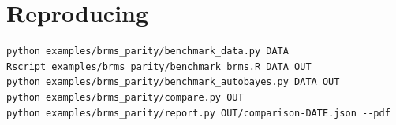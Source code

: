 \documentclass[11pt]{article}
\begin{document}
\section{Reproducing}

\begin{verbatim}
python examples/brms_parity/benchmark_data.py DATA
Rscript examples/brms_parity/benchmark_brms.R DATA OUT
python examples/brms_parity/benchmark_autobayes.py DATA OUT
python examples/brms_parity/compare.py OUT
python examples/brms_parity/report.py OUT/comparison-DATE.json --pdf
\end{verbatim}
\end{document}
